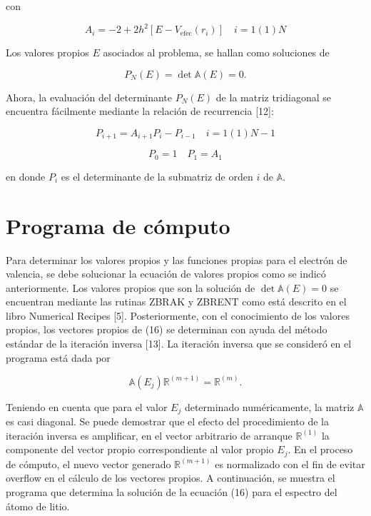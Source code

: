 \documentclass{article}
\begin{document}
con

\[
A_i = -2 + 2h^2[E - V_{\text{efec}}(r_i)] \quad i = 1(1)N
\]

Los valores propios \( E \) asociados al problema, se hallan como soluciones de

\[
P_N(E) = \det \mathbb{A}(E) = 0.
\]

Ahora, la evaluación del determinante \( P_N(E) \) de la matriz tridiagonal se encuentra fácilmente mediante la relación de recurrencia [12]:

\[
P_{i+1} = A_{i+1}P_i - P_{i-1} \quad i = 1(1)N - 1
\]

\[
P_0 = 1 \quad P_1 = A_1
\]

en donde \( P_i \) es el determinante de la submatriz de orden \( i \) de \( \mathbb{A} \).

\section{Programa de cómputo}

Para determinar los valores propios y las funciones propias para el electrón de valencia, se debe solucionar la ecuación de valores propios como se indicó anteriormente. Los valores propios que son la solución de \( \det \mathbb{A}(E) = 0 \) se encuentran mediante las rutinas ZBRAK y ZBRENT como está descrito en el libro Numerical Recipes [5]. Posteriormente, con el conocimiento de los valores propios, los vectores propios de (16) se determinan con ayuda del método estándar de la iteración inversa [13]. La iteración inversa que se consideró en el programa está dada por

\[
\mathbb{A}(E_j)\mathbb{R}^{(m+1)} = \mathbb{R}^{(m)}.
\]

Teniendo en cuenta que para el valor \( E_j \) determinado numéricamente, la matriz \( \mathbb{A} \) es casi diagonal. Se puede demostrar que el efecto del procedimiento de la iteración inversa es amplificar, en el vector arbitrario de arranque \( \mathbb{R}^{(1)} \) la componente del vector propio correspondiente al valor propio \( E_j \). En el proceso de cómputo, el nuevo vector generado \( \mathbb{R}^{(m+1)} \) es normalizado con el fin de evitar overflow en el cálculo de los vectores propios. A continuación, se muestra el programa que determina la solución de la ecuación (16) para el espectro del átomo de litio.
\end{document}
